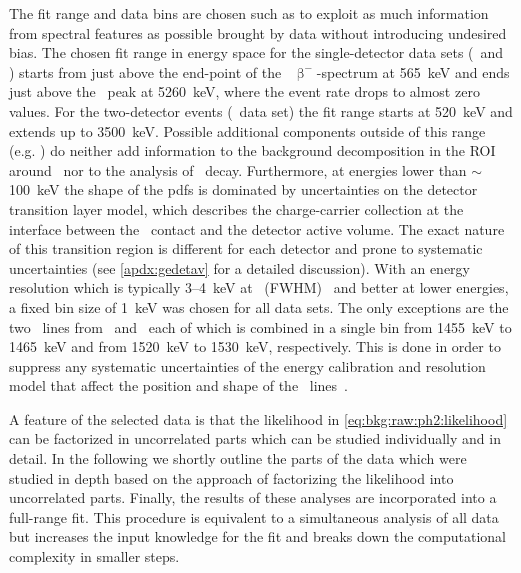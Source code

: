 The fit range and data bins are chosen such as to exploit as much information from
spectral features as possible brought by data without introducing undesired bias. The
chosen fit range in energy space for the single-detector data sets (\enrBEGeII\ and
\enrCoaxII) starts from just above the end-point of the \Arl\ $\upbeta^-$-spectrum at
565~keV and ends just above the \Po\ peak at 5260~keV, where the event rate drops to
almost zero values. For the two-detector events (\enrGeII\ data set) the fit range starts
at 520~keV and extends up to 3500~keV. Possible additional components outside of this
range (e.g. \Arl) do neither add information to the background decomposition in the ROI
around \qbb\ nor to the analysis of \nnbb\ decay. Furthermore, at energies lower than
$\sim$100~keV the shape of the pdfs is dominated by uncertainties on the detector
transition layer model, which describes the charge-carrier collection at the interface
between the \nplus\ contact and the detector active volume. The exact nature of this
transition region is different for each detector and prone to systematic
uncertainties (see \cref{apdx:gedetav} for a detailed discussion).
\newpar
With an energy resolution which is typically 3--4~keV at \qbb\ (FWHM)~\cite{Agostini2018,
Agostini2019a} and better at lower energies, a fixed bin size of 1~keV was chosen for all
data sets. The only exceptions are the two \g\ lines from \kvn\ and \kvz\ each of which is
combined in a single bin from 1455~keV to 1465~keV and from 1520~keV to 1530~keV,
respectively. This is done in order to suppress any systematic uncertainties of the energy
calibration and resolution model that affect the position and shape of the \g\
lines~\cite{Agostini2019}.

A feature of the selected data is that the likelihood in
\cref{eq:bkg:raw:ph2:likelihood} can be factorized in uncorrelated parts which can be
studied individually and in detail. In the following we shortly outline the parts of the
data which were studied in depth based on the approach of factorizing the likelihood into
uncorrelated parts. Finally, the results of these analyses are incorporated into a
full-range fit. This procedure is equivalent to a simultaneous analysis of all data but
increases the input knowledge for the fit and breaks down the computational complexity in
smaller steps.

